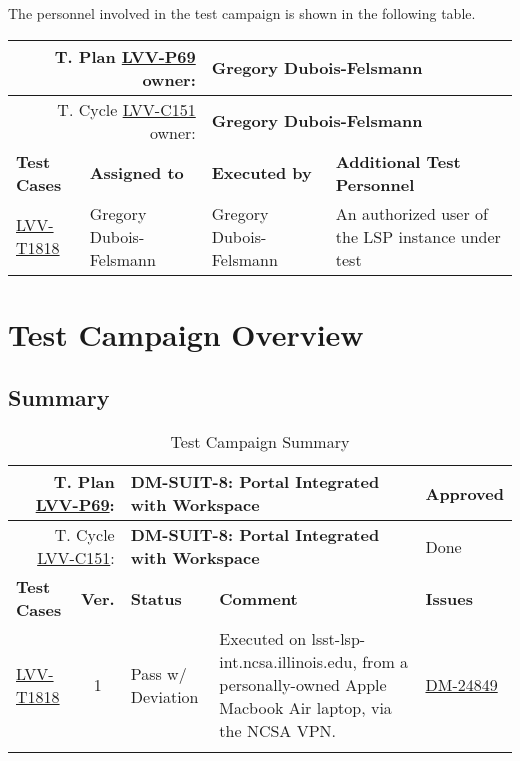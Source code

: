 \documentclass[DM,lsstdraft,STR,toc]{lsstdoc}
\begin{document}
The personnel involved in the test campaign is shown in the following table.

{\small
\begin{longtable}{p{3cm}p{3cm}p{3cm}p{6cm}}
\hline
\multicolumn{2}{r}{T. Plan \href{https://jira.lsstcorp.org/secure/Tests.jspa\#/testPlan/LVV-P69}{LVV-P69} owner:} &
\multicolumn{2}{l}{\textbf{ Gregory Dubois-Felsmann } }\\\hline
\multicolumn{2}{r}{T. Cycle \href{https://jira.lsstcorp.org/secure/Tests.jspa\#/testCycle/LVV-C151}{LVV-C151} owner:} &
\multicolumn{2}{l}{\textbf{
Gregory Dubois-Felsmann}
} \\\hline
\textbf{Test Cases} & \textbf{Assigned to} & \textbf{Executed by} & \textbf{Additional Test Personnel} \\ \hline
\href{https://jira.lsstcorp.org/secure/Tests.jspa#/testCase/LVV-T1818}{LVV-T1818}
& {\small Gregory Dubois-Felsmann } & {\small Gregory Dubois-Felsmann } &
\begin{minipage}[]{6cm}
\smallskip
{\small An authorized user of the LSP instance under test }
\medskip
\end{minipage}
\\ \hline
\end{longtable}
}

\newpage

\section{Test Campaign Overview}
\label{sect:overview}

\subsection{Summary}
\label{sect:summarytable}

{\small
\begin{longtable}{p{2cm}cp{2.3cm}p{8.6cm}p{2.3cm}}
\toprule
\multicolumn{2}{r}{ T. Plan \href{https://jira.lsstcorp.org/secure/Tests.jspa\#/testPlan/LVV-P69}{LVV-P69}:} &
\multicolumn{2}{p{10.9cm}}{\textbf{ DM-SUIT-8: Portal Integrated with Workspace }} & Approved \\\hline
\multicolumn{2}{r}{ T. Cycle \href{https://jira.lsstcorp.org/secure/Tests.jspa\#/testCycle/LVV-C151}{LVV-C151}:} &
\multicolumn{2}{p{10.9cm}}{\textbf{ DM-SUIT-8: Portal Integrated with Workspace }} & Done \\\hline
\textbf{Test Cases} &  \textbf{Ver.} & \textbf{Status} & \textbf{Comment} & \textbf{Issues} \\\toprule
\href{https://jira.lsstcorp.org/secure/Tests.jspa#/testCase/LVV-T1818}{LVV-T1818}
&  1
& Pass w/ Deviation &
\begin{minipage}[]{9cm}
\smallskip
Executed on lsst-lsp-int.ncsa.illinois.edu, from a personally-owned
Apple Macbook Air laptop, via the NCSA VPN.
\medskip
\end{minipage}
&
\href{https://jira.lsstcorp.org/browse/DM-24849}{DM-24849}
\\\hline
\caption{Test Campaign Summary}
\label{table:summary}
\end{longtable}
}
\end{document}
